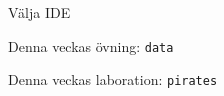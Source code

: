 
\ifkompendium\else
{}

\begin{Slide}{Välja IDE}
\end{Slide}

\begin{Slide}{Denna veckas övning: \texttt{data}}
\begin{itemize}\SlideFontTiny

\end{itemize}
\end{Slide}

\begin{Slide}{Denna veckas laboration: \texttt{pirates}}
\begin{itemize}\SlideFontSmall

\end{itemize}
\end{Slide}

\fi




